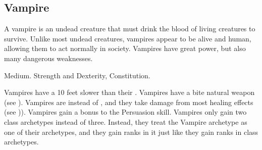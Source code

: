 


    \subsection{Vampire}
        A vampire is an undead creature that must drink the blood of living creatures to survive.
        Unlike most undead creatures, vampires appear to be alive and human, allowing them to act normally in society.
        Vampires have great power, but also many dangerous weaknesses.

         Medium.
          Strength and Dexterity,  Constitution.
        \begin{itemize}
             Vampires have a  10 feet slower than their .
             Vampires have a bite natural weapon (see ).
             Vampires are  instead of , and they take damage from most healing effects (see )).
             Vampires gain a  bonus to the Persuasion skill.
             Vampires only gain two class archetypes instead of three.
                Instead, they treat the Vampire archetype as one of their archetypes, and they gain ranks in it just like they gain ranks in class archetypes.
        \end{itemize}

